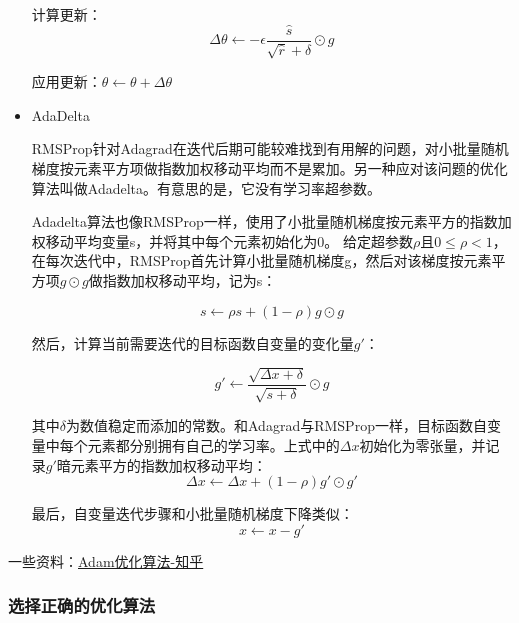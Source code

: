\begin{itemize}
\begin{algorithm}
\begin{algorithmic}
	计算更新：
	\begin{displaymath}
	\Delta \theta \leftarrow - \epsilon \frac{\hat{s}}{\sqrt{\hat{r}}+\delta} \odot g
	\end{displaymath}
	
	应用更新：$\theta \leftarrow \theta + \Delta \theta $
\end{algorithmic}
\end{algorithm}

\item AdaDelta

RMSProp针对Adagrad在迭代后期可能较难找到有用解的问题，对小批量随机梯度按元素平方项做指数加权移动平均而不是累加。另一种应对该问题的优化算法叫做Adadelta。有意思的是，它没有学习率超参数。

Adadelta算法也像RMSProp一样，使用了小批量随机梯度按元素平方的指数加权移动平均变量s，并将其中每个元素初始化为0。  给定超参数$\rho$且$0≤\rho<1$， 在每次迭代中，RMSProp首先计算小批量随机梯度g，然后对该梯度按元素平方项$g\odot g$做指数加权移动平均，记为s：

\begin{displaymath}
s \leftarrow \rho s + ( 1- \rho) g \odot g
\end{displaymath}

然后，计算当前需要迭代的目标函数自变量的变化量$g'$：

\begin{displaymath}
g' \leftarrow \frac{\sqrt{\Delta x + \delta}}{\sqrt{s + \delta}} \odot g
\end{displaymath}

其中$\delta$为数值稳定而添加的常数。和Adagrad与RMSProp一样，目标函数自变量中每个元素都分别拥有自己的学习率。上式中的$\Delta x$初始化为零张量，并记录$g'$暗元素平方的指数加权移动平均：
\begin{displaymath}
\Delta x \leftarrow \Delta x + (1 - \rho)g' \odot g'
\end{displaymath}

最后，自变量迭代步骤和小批量随机梯度下降类似：
\begin{displaymath}
x \leftarrow x - g'
\end{displaymath}

\end{itemize}

一些资料：\href{https://zhuanlan.zhihu.com/p/33385885}{Adam优化算法-知乎}

\subsubsection{选择正确的优化算法}


